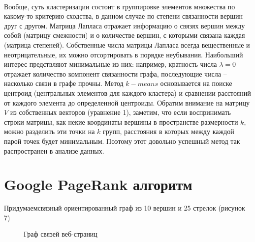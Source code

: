 \documentclass[a5paper, 10pt]{article}
\theoremstyle{definition}
\theoremstyle{plain}
\theoremstyle{remark}
\begin{document}
\\ Вообще, суть кластеризации состоит в группировке элементов множества по какому-то критерию сходства, в данном случае по степени связанности вершин друг с другом. Матрица Лапласа отражает информацию о связях вершин между собой (матрицу смежности) и о количестве вершин, с которыми связана каждая (матрица степеней). Собственные числа матрицы Лапласа всегда вещественные и неотрицательные, их можно отсортировать в порядке неубывания. Наибольший интерес предствляют минимальные из них: например, кратность числа $\lambda = 0$ отражает количество компонент связанности графа, последующие числа -- насколько связи в графе прочны. Метод $k-means$ основывается на поиске центроид (центральных элементов для каждого кластера) и сравнении расстояний от каждого элемента до определенной центроиды. Обратим внимание на матрицу $V$ из собственных векторов (уравнение 1), заметим, что если воспринимать строки матрицы, как некие координаты вершины в пространстве размерности $k$, можно разделить эти точки на $k$ групп, расстояния в которых между каждой парой точек будет минимальным. Поэтому этот довольно успешный метод так распространен в анализе данных.

\newpage
\section{Google PageRank алгоритм}
Придумаемсвязный ориентированный граф из 10 вершин и 25 стрелок (рисунок 7)
\begin{figure}[h!]
\caption{Граф связей веб-страниц}
\end{figure}
\end{document}
